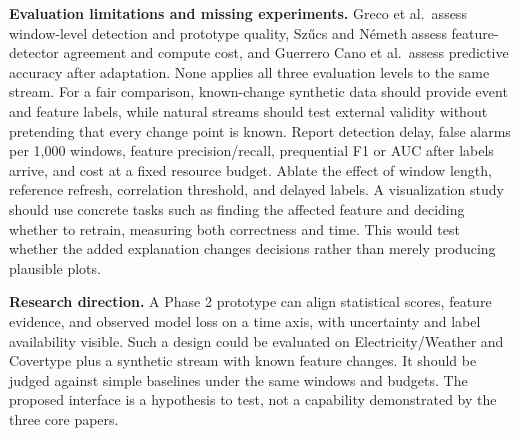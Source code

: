 \documentclass[10pt,a4paper]{article}
\begin{document}
\textbf{Evaluation limitations and missing experiments.} Greco et al.\ assess window-level detection and prototype quality, Sz\H{u}cs and N\'emeth assess feature-detector agreement and compute cost, and Guerrero Cano et al.\ assess predictive accuracy after adaptation. None applies all three evaluation levels to the same stream. For a fair comparison, known-change synthetic data should provide event and feature labels, while natural streams should test external validity without pretending that every change point is known. Report detection delay, false alarms per 1,000 windows, feature precision/recall, prequential F1 or AUC after labels arrive, and cost at a fixed resource budget. Ablate the effect of window length, reference refresh, correlation threshold, and delayed labels. A visualization study should use concrete tasks such as finding the affected feature and deciding whether to retrain, measuring both correctness and time. This would test whether the added explanation changes decisions rather than merely producing plausible plots.

\textbf{Research direction.} A Phase 2 prototype can align statistical scores, feature evidence, and observed model loss on a time axis, with uncertainty and label availability visible. Such a design could be evaluated on Electricity/Weather and Covertype plus a synthetic stream with known feature changes. It should be judged against simple baselines under the same windows and budgets. The proposed interface is a hypothesis to test, not a capability demonstrated by the three core papers.
\end{document}
